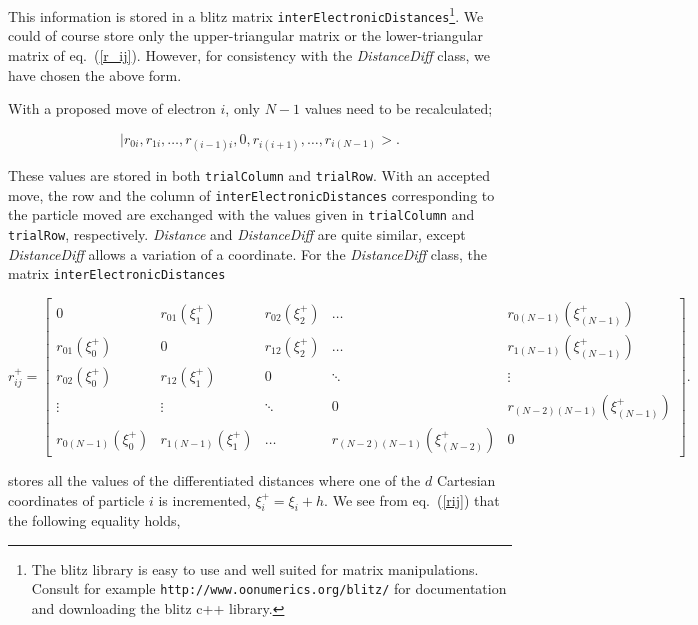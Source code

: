 This information is stored in a blitz matrix
\lstinline$interElectronicDistances$\footnote{The blitz library is
  easy to use and well suited for matrix manipulations. Consult for
  example \lstinline$http://www.oonumerics.org/blitz/$ for
  documentation and downloading the blitz c++ library.}. We could of
course store only the upper-triangular matrix or the lower-triangular
matrix of eq.~(\ref{r_ij}). However, for consistency with the
\emph{DistanceDiff} class, we have chosen the above form. 

With a proposed move of electron $i$, only $N-1$ values need to be
recalculated;

\begin{equation}
  | r_{0i}, r_{1i}, \dots, r_{(i-1)i}, 0,  r_{i(i+1)},\dots, r_{i (N-1)} >.
\end{equation}

These values are stored in both \lstinline$trialColumn$ and
\lstinline$trialRow$. With an accepted move, the row and the column of
\lstinline$interElectronicDistances$ corresponding to the particle
moved are exchanged with the values given in \lstinline$trialColumn$ and
\lstinline$trialRow$, respectively.
\newline
%
\newline
\emph{Distance} and \emph{DistanceDiff} are quite similar, except
\emph{DistanceDiff} allows a variation of a coordinate.
For the \emph{DistanceDiff} class, the matrix
\lstinline$interElectronicDistances$

\begin{equation}
  r_{ij}^+ = \left[
  \begin{array}{ccccc}
    0               & r_{01}(\xi_{1}^+)   &r_{02}(\xi_{2}^+)& \dots             & r_{0 (N-1)}(\xi_{(N-1)}^+) \\
    r_{01}(\xi_{0}^+)    & 0             &r_{12}(\xi_{2}^+)& \dots             & r_{1 (N-1)}(\xi_{(N-1)}^+) \\
    r_{02}(\xi_{0}^+)    & r_{12}(\xi_{1}^+)  &  0         & \ddots            & \vdots       \\
    \vdots          & \vdots        & \ddots     & 0       & r_{(N-2)(N-1)}(\xi_{(N-1)}^+)       \\
    r_{0(N-1)}(\xi_{0}^+)&r_{1(N-1)}(\xi_{1}^+)& \dots     &r_{(N-2)(N-1)}(\xi_{(N-2)}^+)  &  0
  \end{array} \right].
\label{rijDiff}
\end{equation}

stores all the values of the differentiated distances where one of the
$d$ Cartesian coordinates of particle $i$ is incremented, 
$\xi_i^+ = \xi_i+h$. We see from eq.~(\ref{rij}) that the following
equality holds,


